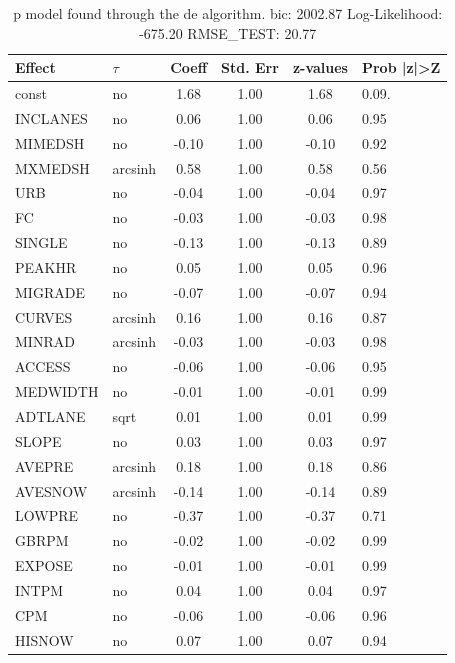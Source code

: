 \begin{table}
	\caption{p model found through the de algorithm. bic: 2002.87 Log-Likelihood: -675.20 RMSE_TEST: 20.77}
	\begin{center}
		\begin{tabular}{|l|l|c|c|c|l|}
			\hline
			Effect & $\tau$ & Coeff & Std. Err & z-values & Prob |z|>Z \\
			\hline
			const & no & 1.68 & 1.00 & 1.68 & 0.09. \\
			\hline
			INCLANES & no & 0.06 & 1.00 & 0.06 & 0.95 \\
			\hline
			MIMEDSH & no & -0.10 & 1.00 & -0.10 & 0.92 \\
			\hline
			MXMEDSH & arcsinh & 0.58 & 1.00 & 0.58 & 0.56 \\
			\hline
			URB & no & -0.04 & 1.00 & -0.04 & 0.97 \\
			\hline
			FC & no & -0.03 & 1.00 & -0.03 & 0.98 \\
			\hline
			SINGLE & no & -0.13 & 1.00 & -0.13 & 0.89 \\
			\hline
			PEAKHR & no & 0.05 & 1.00 & 0.05 & 0.96 \\
			\hline
			MIGRADE & no & -0.07 & 1.00 & -0.07 & 0.94 \\
			\hline
			CURVES & arcsinh & 0.16 & 1.00 & 0.16 & 0.87 \\
			\hline
			MINRAD & arcsinh & -0.03 & 1.00 & -0.03 & 0.98 \\
			\hline
			ACCESS & no & -0.06 & 1.00 & -0.06 & 0.95 \\
			\hline
			MEDWIDTH & no & -0.01 & 1.00 & -0.01 & 0.99 \\
			\hline
			ADTLANE & sqrt & 0.01 & 1.00 & 0.01 & 0.99 \\
			\hline
			SLOPE & no & 0.03 & 1.00 & 0.03 & 0.97 \\
			\hline
			AVEPRE & arcsinh & 0.18 & 1.00 & 0.18 & 0.86 \\
			\hline
			AVESNOW & arcsinh & -0.14 & 1.00 & -0.14 & 0.89 \\
			\hline
			LOWPRE & no & -0.37 & 1.00 & -0.37 & 0.71 \\
			\hline
			GBRPM & no & -0.02 & 1.00 & -0.02 & 0.99 \\
			\hline
			EXPOSE & no & -0.01 & 1.00 & -0.01 & 0.99 \\
			\hline
			INTPM & no & 0.04 & 1.00 & 0.04 & 0.97 \\
			\hline
			CPM & no & -0.06 & 1.00 & -0.06 & 0.96 \\
			\hline
			HISNOW & no & 0.07 & 1.00 & 0.07 & 0.94 \\

\end{tabular}
\end{center}
\end{table}
